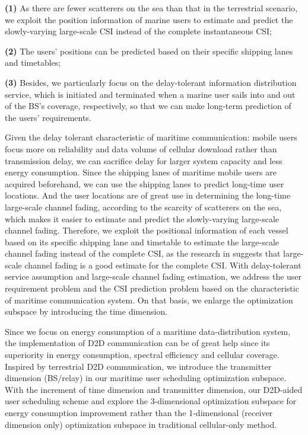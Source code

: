 \documentclass{ieeeaccess}
\begin{document}
\textbf{(1)} As there are fewer scatterers on the sea than that in the terrestrial scenario, we exploit the position information of marine users to estimate and predict the slowly-varying large-scale CSI instead of the complete instantaneous CSI;

\textbf{(2)} The users' positions can be predicted based on their specific shipping lanes and timetables;

\textbf{(3)} Besides, we particularly focus on the delay-tolerant information distribution service, which is initiated and terminated when a marine user sails into and out of the BS's coverage, respectively, so that we can make long-term prediction of the users' requirements.


Given the delay tolerant characteristic of maritime communication: mobile users focus more on reliability and data volume of cellular download rather than transmission delay, we can sacrifice delay for larger system capacity and less energy consumption. 
Since the shipping lanes of maritime mobile users are acquired beforehand, we can use the shipping lanes to predict long-time user locations. And the user locations are of great use in determining the long-time large-scale channel fading, according to the scarcity of scatterers on the sea, which makes it easier to estimate and predict the slowly-varying large-scale channel fading. Therefore, we exploit the positional information of each vessel based on its specific shipping lane and timetable to estimate the large-scale channel fading instead of the complete CSI, as the research in \cite{p120} suggests that large-scale channel fading is a good estimate for the complete CSI. %
With delay-tolerant service assumption and large-scale channel fading estimation, we address the user requirement problem and the CSI prediction problem based on the characteristic of maritime communication system. On that basis, we enlarge the optimization subspace by introducing the time dimension. 

Since we focus on energy consumption of a maritime data-distribution system, the implementation of D2D communication can be of great help since its superiority in energy consumption, spectral efficiency and cellular coverage. Inspired by terrestrial D2D communication, we introduce the transmitter dimension (BS/relay) in our maritime user scheduling optimization subspace. With the increment of time dimension and transmitter dimension, our D2D-aided user scheduling scheme and explore the 3-dimensional optimization subspace for energy consumption improvement rather than the 1-dimensional (receiver dimension only) optimization subspace in traditional cellular-only method. 
\end{document}
